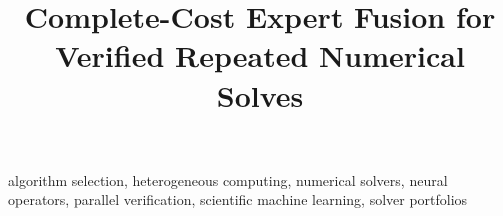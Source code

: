 \documentclass[10pt,journal,compsoc]{IEEEtran}
\title{Complete-Cost Expert Fusion for Verified Repeated Numerical Solves}
\begin{document}
\maketitle



\begin{IEEEkeywords}
algorithm selection, heterogeneous computing, numerical solvers, neural operators,
parallel verification, scientific machine learning, solver portfolios
\end{IEEEkeywords}













\end{document}
